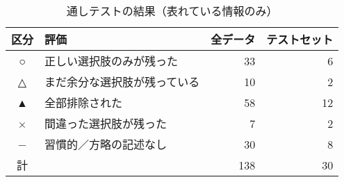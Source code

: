 \documentclass[japanese]{jnlp_1.3a}
\begin{document}
\begin{table}[b]
  \caption{通しテストの結果（表れている情報のみ）}
  \begin{center}
    \begin{tabular}{|c l|r|r|} \hline
	区分 & 評価 & 全データ & テストセット\\ \hline
	○ & 正しい選択肢のみが残った     & 33 &  6\\
	△ & まだ余分な選択肢が残っている & 10 &  2\\
	▲ & 全部排除された               & 58 & 12\\
	× & 間違った選択肢が残った       &  7 &  2\\
	− & 習慣的／方略の記述なし       & 30 &  8\\ \hline
	計 &                             & 138 & 30\\ \hline
    \end{tabular}
    \label{tab:6_8}
  \end{center}
\end{table}
\end{document}
